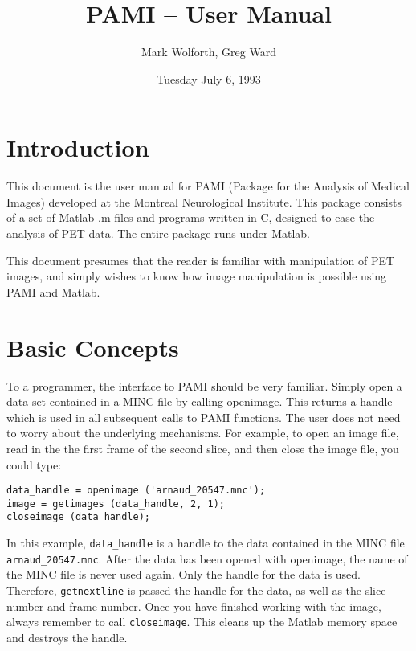 
\title{PAMI -- User Manual}
\author{Mark Wolforth, Greg Ward}
\date{Tuesday July 6, 1993}  

\def\code#1{{\tt #1}}

 

\maketitle
\newpage

\tableofcontents

\newpage
\section{Introduction}

This document is the user manual for PAMI (Package for the Analysis of
Medical Images) developed at the Montreal Neurological Institute.
This package consists of a set of Matlab .m files and programs written
in C, designed to ease the analysis of PET data.  The entire package
runs under Matlab.

This document presumes that the reader is familiar with manipulation
of PET images, and simply wishes to know how image manipulation is
possible using PAMI and Matlab.


\newpage
\section{Basic Concepts}

To a programmer, the interface to PAMI should be very familiar.
Simply open a data set contained in a MINC file by calling openimage.
This returns a handle which is used in all subsequent calls to PAMI
functions.  The user does not need to worry about the underlying
mechanisms.  For example, to open an image file, read in the the first
frame of the second slice, and then close the image file, you could
type:


\begin{verbatim}
data_handle = openimage ('arnaud_20547.mnc');
image = getimages (data_handle, 2, 1);
closeimage (data_handle);
\end{verbatim}


In this example, \verb+data_handle+ is a handle to the data contained in the
MINC file \verb+arnaud_20547.mnc+.  After the data has been opened with
openimage, the name of the MINC file is never used again.  Only the handle for
the data is used.  Therefore, \verb+getnextline+ is passed the handle for the
data, as well as the slice number and frame number.  Once you have finished
working with the image, always remember to call \verb+closeimage+.  This
cleans up the Matlab memory space and destroys the handle.

